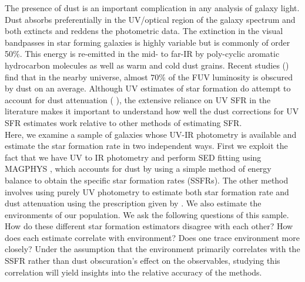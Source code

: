 The presence of dust is an important complication in any analysis of galaxy light. Dust absorbs preferentially in the UV/optical region of the galaxy spectrum and both extincts and reddens the photometric data. The extinction in the visual bandpasses in star forming galaxies is highly variable but is commonly of order 50\%. This energy is re-emitted in the mid- to far-IR by poly-cyclic aromatic hydrocarbon molecules as well as warm and cold dust grains. Recent studies (\citealt{burgarella_herschel_2013}) find that in the nearby universe, almost $70\%$ of the FUV luminosity is obscured by dust on an average. Although UV estimates of star formation do attempt to account for dust attenuation (\citet{salim_uv_2007-1} ), the extensive reliance on UV SFR in the literature \citep[\emph{e.g.}][among others]{peng_mass_2010, moustakas_primus_2013, karim_star_2011, lee_comparison_2009, wyder_uvoptical_2007} makes it important to understand how well the dust corrections for UV SFR estimates work relative to other methods of estimating SFR.\\

Here, we examine a sample of galaxies whose UV-IR photometry is available and estimate the star formation rate in two independent ways. First we exploit the fact that we have UV to IR photometry and perform SED fitting using MAGPHYS \citep{da_cunha_simple_2008}, which accounts for dust by using a simple method of energy balance to obtain the specific star formation rates (SSFRs). The other method involves using purely UV photometry to estimate both star formation rate and dust attenuation using the prescription given by \citet{salim_uv_2007-1}. We also estimate the environments of our population. We ask the following questions of this sample. How do these different star formation estimators disagree with each other? How does each estimate correlate with environment? Does one trace environment more closely? Under the assumption that the environment primarily correlates with the SSFR rather than dust obscuration's effect on the observables, studying this correlation will yield insights into the relative accuracy of the methods.\\

